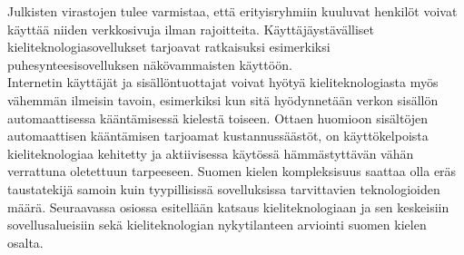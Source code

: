 \begin{multicols}{2}
Julkisten virastojen tulee varmistaa, että erityisryhmiin kuuluvat
henkilöt voivat käyttää niiden verkkosivuja ilman
rajoitteita. Käyttäjäystävälliset kieliteknologiasovellukset tarjoavat
ratkaisuksi esimerkiksi puhesynteesisovelluksen näkövammaisten
käyttöön.\\
Internetin käyttäjät ja sisällöntuottajat voivat hyötyä
kieliteknologiasta myös vähemmän ilmeisin tavoin, esimerkiksi kun sitä
hyödynnetään verkon sisällön automaattisessa kääntämisessä kielestä
toiseen. Ottaen huomioon  sisältöjen automaattisen
kääntämisen tarjoamat kustannussäästöt, on käyttökelpoista kieliteknologiaa kehitetty 
ja aktiivisessa käytössä hämmästyttävän vähän 
verrattuna oletettuun tarpeeseen. Suomen kielen kompleksisuus saattaa olla 
eräs taustatekijä samoin kuin tyypillisissä sovelluksissa tarvittavien 
teknologioiden määrä. Seuraavassa osiossa esitellään katsaus kieliteknologiaan 
ja sen keskeisiin sovellusalueisiin sekä kieliteknologian
nykytilanteen arviointi suomen kielen osalta.



\end{multicols}
\clearpage
{}


